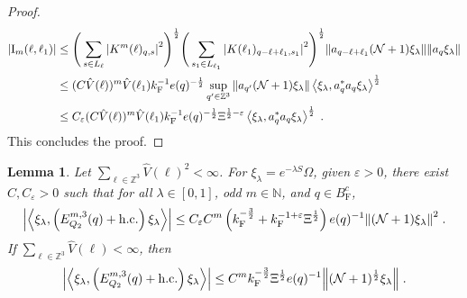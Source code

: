 \documentclass[12pt,a4paper]{article}
\numberwithin{equation}{section}
\newcommand{\NNN}{\mathbb{N}}
\newcommand{\1}{\mathbb{I}}
\newcommand{\F}{\mathrm{F}}
\newcommand{\I}{\mathrm{I}}
\newcommand{\kF}{k_\F}
\newcommand{\Zstar}{\mathbb{Z}^3} %
\newcommand{\Z}{\mathbb{Z}}
\newcommand{\NN}{\mathcal{N}}
\newcommand{\half}{\frac{1}{2}}
\newcommand{\eva}[1]{\left\langle #1 \right\rangle}
\theoremstyle{plain}
\newtheorem{lemma}[theorem]{Lemma}
\theoremstyle{definition}
\theoremstyle{remark}
\theoremstyle{plain}
\theoremstyle{definition}
\theoremstyle{remark}
\begin{document}
\begin{proof}
\begin{align}
	|\I_m(\ell, \ell_1)|
	&\leq \Bigg(\sum\limits_{s \in L_{\ell}} \abs{K^m(\ell)_{q,s}}^2\Bigg)^\half
		\Bigg(\sum\limits_{s_1 \in L_{\ell_1}} \abs{K(\ell_1)_{q-\ell+\ell_1,s_1}}^2\Bigg)^\half
		\norm{ a_{q-\ell+\ell_1} (\NN+1) \xi_\lambda}
		\norm{ a_q \xi_\lambda }\nonumber\\
	&\leq (C \hat{V}(\ell))^m \hat{V}(\ell_1) \kF^{-1} e(q)^{-\half}
		\sup_{q' \in \Z^3} \norm{ a_{q'} (\NN+1) \xi_\lambda }
		\eva{\xi_\lambda, a_q^* a_q \xi_\lambda}^{\half} \nonumber\\
	&\leq C_\varepsilon (C \hat{V}(\ell))^m
		\hat{V}(\ell_1)
		\kF^{-1} e(q)^{-\half} \Xi^{\half-\varepsilon} \eva{\xi_\lambda, a_q^* a_q \xi_\lambda}^{\half} \;. \label{eq:estEQ2113_bis}
\end{align}
This concludes the proof.
\end{proof}



\begin{lemma} \label{lem:EQ215}
Let $ \sum_{\ell \in \Zstar} \hat{V}(\ell)^2 < \infty$. For $\xi_\lambda = e^{-\lambda S} \Omega$, given $ \varepsilon > 0 $, there exist $ C, C_\varepsilon > 0 $ such that for all $ \lambda \in [0,1] $, odd $ m \in \NNN $, and $ q \in B_{\F}^c $,
\begin{align} \label{eq:estEQ215_Coulomb}
	\abs{\eva{\xi_\lambda,\left(E^{m,3}_{Q_2}(q) +\mathrm{h.c.}\right) \xi_\lambda }}
	\leq C_\varepsilon C^m \left( \kF^{-\frac 32}
		+ \kF^{-1 + \varepsilon} \Xi^\half \right)
		e(q)^{-1}
		\norm{(\NN+1) \xi_\lambda}^2 \;.
\end{align}
If $ \sum_{\ell \in \Zstar} \hat{V}(\ell) < \infty $, then
\begin{align} \label{eq:estEQ215}
	\abs{\eva{\xi_\lambda,\left(E^{m,3}_{Q_2}(q) + \mathrm{h.c.}\right) \xi_\lambda }}
	\leq C^m \kF^{-\frac{3}{2}} \Xi^{\half} e(q)^{-1}
		\norm{(\NN+1)^\half \xi_\lambda } \;.
\end{align}
\end{lemma}
\end{document}
